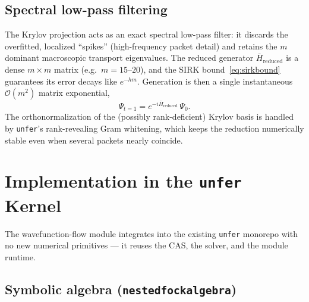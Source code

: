 \documentclass[11pt, a4paper]{article}
\begin{document}
\subsection{Spectral low-pass filtering}

The Krylov projection acts as an exact spectral low-pass filter: it discards
the overfitted, localized ``spikes'' (high-frequency packet detail) and
retains the $m$ dominant macroscopic transport eigenvalues. The reduced
generator $\bar H_{\mathrm{reduced}}$ is a dense $m\times m$ matrix (e.g.\
$m=15$--$20$), and the SIRK bound~\eqref{eq:sirkbound} guarantees its error
decays like $e^{-hm}$. Generation is then a single instantaneous
$\mathcal{O}(m^2)$ matrix exponential,
\begin{equation}
  \Psi_{t=1}=e^{-i\bar H_{\mathrm{reduced}}}\,\Psi_0 .
\end{equation}
The orthonormalization of the (possibly rank-deficient) Krylov basis is handled
by \texttt{unfer}'s rank-revealing Gram whitening, which keeps the reduction
numerically stable even when several packets nearly coincide.

\section{Implementation in the \texttt{unfer} Kernel}
\label{sec:impl}

The wavefunction-flow module integrates into the existing \texttt{unfer}
monorepo with no new numerical primitives --- it reuses the CAS, the solver, and
the module runtime.

\subsection{Symbolic algebra (\texttt{nested\textunderscore fock\textunderscore algebra})}
\end{document}
